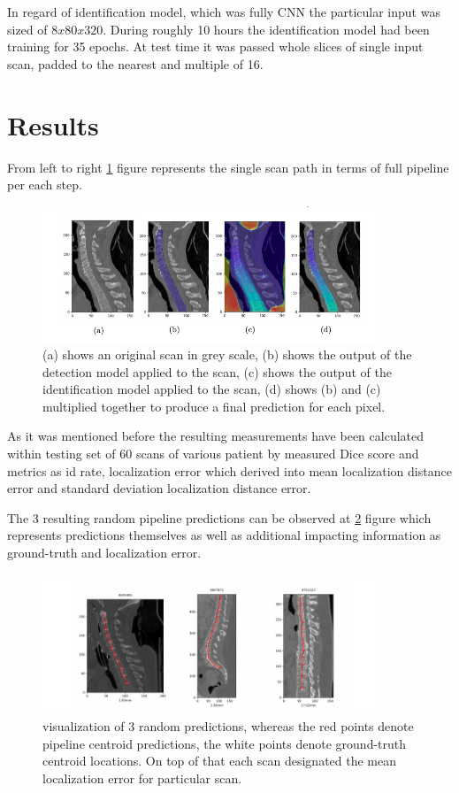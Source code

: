 In regard of identification model, which was fully CNN the particular input was sized of $8x80x320$. During roughly 10 hours the identification model had been training for 35 epochs. At test time it was passed whole slices of single input scan, padded to the nearest and multiple of 16.


\section{Results}
From left to right \ref{fig:step_step_predictions} figure represents the single scan path in terms of full pipeline per each step. 

\begin{figure}[h]
    \centering \includegraphics[width=10cm]{images/step_step_predictions.png}
    \caption {(a) shows an original scan in grey scale, (b) shows the output of the detection model applied to the scan, (c) shows the output of the identification model
    applied to the scan, (d) shows (b) and (c) multiplied together to produce a final prediction for each pixel.}
    \label{fig:step_step_predictions}
\end{figure}

As it was mentioned before the resulting measurements have been calculated within testing set of 60 scans of various patient by measured Dice score and metrics as id rate, localization error which derived into mean localization distance error and standard deviation localization distance error.

The 3 resulting random pipeline predictions can be observed at \ref{fig:predictions} figure which represents predictions themselves as well as additional impacting information as ground-truth and localization error. 
\begin{figure}[h]
    \centering \includegraphics[width=10cm]{images/predictions.png}
    \caption {visualization of 3 random predictions, whereas the red points denote pipeline centroid predictions, the white points denote ground-truth centroid locations. On top of that each scan designated the mean localization error for particular scan.}
    \label{fig:predictions}
\end{figure}

